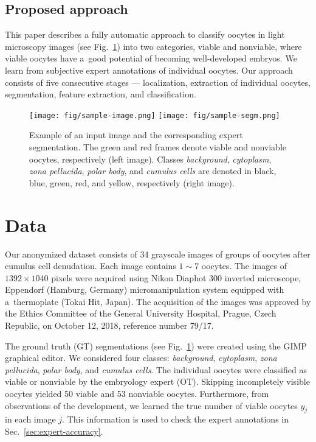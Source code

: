 \documentclass[]{spie}  %
\begin{document}
\subsection{Proposed approach}

This paper describes a fully automatic approach to classify oocytes in light
microscopy images (see Fig.~\ref{fig:image-sample}) into two categories, viable
and nonviable, where viable oocytes have a~good potential of becoming
well-developed embryos. We learn from subjective expert annotations of
individual oocytes.  Our approach 
consists of five consecutive stages --- localization, extraction of individual oocytes,
segmentation, feature extraction, and classification.

\begin{figure}[tb]
\centering
\texttt{[image: fig/sample-image.png]}
\texttt{[image: fig/sample-segm.png]}
\caption{Example of an input image and the corresponding expert segmentation.
 The green and red frames denote viable and nonviable oocytes, respectively (left image). Classes \textit{background}, \textit{cytoplasm}, \textit{zona pellucida},
\textit{polar body}, and \textit{cumulus cells} are denoted in black, blue,
green, red, and yellow, respectively (right image).}
\label{fig:image-sample}
\end{figure}

\section{Data}
\label{sec:data}

Our anonymized dataset consists of 34 grayscale images of groups of oocytes
after cumulus cell denudation. Each image contains $1\sim 7$ oocytes. The images of $1392 \times 1040$ pixels were
acquired using Nikon Diaphot 300 inverted microscope, Eppendorf (Hamburg,
Germany) micromanipulation system equipped with a~thermoplate (Tokai Hit,
Japan). The acquisition of the images was approved by the Ethics Committee of the General University Hospital, Prague, Czech Republic, on October 12, 2018, reference number 79/17.

The ground truth (GT) segmentations (see Fig.~\ref{fig:image-sample}) were
created using the GIMP graphical editor. We considered four classes: \textit{background}, \textit{cytoplasm}, \textit{zona pellucida}, \textit{polar body}, and \textit{cumulus cells}.  The individual oocytes were classified as viable or nonviable
by the embryology expert (OT). Skipping incompletely visible oocytes yielded 50 viable and 53
nonviable oocytes. Furthermore, from
observations of the development, we learned the true number of viable oocytes $y_j$ in
each image $j$. This information is used to check the expert annotations in Sec.~{\ref{sec:expert-accuracy}}.
\end{document}
